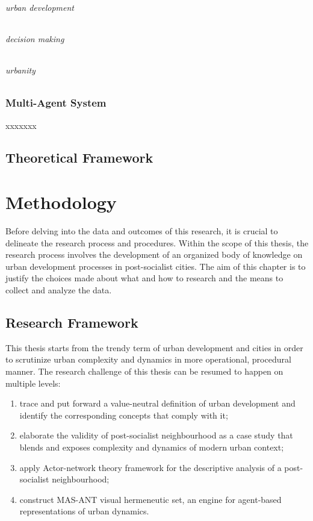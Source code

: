 \documentclass[11pt]{report}
\begin{document}
\subparagraph{urban development}

\subparagraph{decision making}

\subparagraph{urbanity}


\subsection{Multi-Agent System}

xxxxxxx

\section{Theoretical Framework}



\chapter{Methodology}

Before delving into the data  and outcomes of this research, it is crucial to delineate the research process and procedures. Within the scope of this thesis, the research process involves the development of an organized body of knowledge on urban development processes in post-socialist cities. The aim of this chapter is to justify the choices made about what and how to research and the means to collect and analyze the data. 

\section{Research Framework}

This thesis starts from the trendy term of urban development and cities in order to scrutinize urban complexity and dynamics in more operational, procedural manner. The research challenge of this thesis can be resumed to happen on multiple levels:
\begin{enumerate}
\item trace and put forward a value-neutral definition of urban development and identify the corresponding concepts that comply with it;
\item elaborate the validity of post-socialist neighbourhood as a case study that blends and exposes complexity and dynamics of modern urban context;
\item apply Actor-network theory framework for the descriptive analysis of a post-socialist neighbourhood;
\item construct MAS-ANT visual hermeneutic set, an engine for agent-based representations of urban dynamics.    
\end{enumerate}
\end{document}
